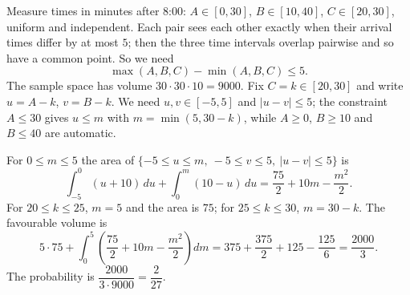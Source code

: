 Measure times in minutes after 8:00: $A\in[0,30]$, $B\in[10,40]$, $C\in[20,30]$, uniform and independent. Each pair sees each other exactly when their arrival times differ by at most $5$; then the three time intervals overlap pairwise and so have a common point. So we need
\[
\max(A,B,C)-\min(A,B,C)\le5 .
\]
The sample space has volume $30\cdot30\cdot10=9000$. Fix $C=k\in[20,30]$ and write $u=A-k$, $v=B-k$. We need $u,v\in[-5,5]$ and $|u-v|\le5$; the constraint $A\le30$ gives $u\le m$ with $m=\min(5,30-k)$, while $A\ge0$, $B\ge10$ and $B\le40$ are automatic.

For $0\le m\le5$ the area of $\{-5\le u\le m,\ -5\le v\le5,\ |u-v|\le5\}$ is
\[
\int_{-5}^{0}(u+10)\,du+\int_0^{m}(10-u)\,du=\dfrac{75}{2}+10m-\dfrac{m^2}{2}.
\]
For $20\le k\le25$, $m=5$ and the area is $75$; for $25\le k\le30$, $m=30-k$. The favourable volume is
\[
5\cdot75+\int_0^5\left(\dfrac{75}{2}+10m-\dfrac{m^2}{2}\right)dm=375+\dfrac{375}{2}+125-\dfrac{125}{6}=\dfrac{2000}{3}.
\]
The probability is $\dfrac{2000}{3\cdot9000}=\boxed{\dfrac{2}{27}}$.
